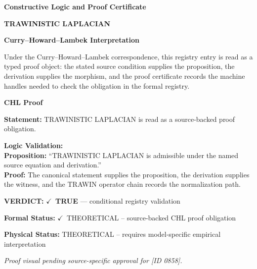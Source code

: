 \clearpage
\begingroup\tzpsupportsetup
\noindent\textbf{\fontsize{10.8pt}{12.8pt}\selectfont [ID 0858] Constructive Logic and Proof Certificate}\par
\noindent\textbf{\fontsize{10pt}{12pt}\selectfont TRAWINISTIC LAPLACIAN}\par
\vspace{0.45em}
\begingroup
\footnotesize
\setlength{\parskip}{0.22em}
\setlength{\parindent}{0pt}
\noindent\textbf{Curry--Howard--Lambek Interpretation}\par
Under the Curry--Howard--Lambek correspondence, this registry entry is read as a typed proof
object: the stated source condition supplies the proposition, the derivation supplies the
morphism, and the proof certificate records the machine handles needed to check the obligation
in the formal registry.

\vspace{0.45em}
\noindent\textbf{CHL Proof}\par
\textbf{Statement:} TRAWINISTIC LAPLACIAN is read as a source-backed proof obligation.

\textbf{Logic Validation:}\\
\textbf{Proposition:} ``TRAWINISTIC LAPLACIAN is admissible under the named source equation and derivation.''\\
\textbf{Proof:} The canonical statement supplies the proposition, the derivation supplies the witness, and the TRAWIN operator chain records the normalization path.

\textbf{VERDICT:} \ensuremath{\checkmark}\ \textbf{TRUE} --- conditional registry validation

\textbf{Formal Status:} \ensuremath{\checkmark}\ THEORETICAL -- source-backed CHL proof obligation

\textbf{Physical Status:} THEORETICAL -- requires model-specific empirical interpretation
\par\vspace{0.45em}
\par
\vfill
\begingroup\footnotesize\itshape
Proof visual pending source-specific approval for [ID 0858].
\par\endgroup
\vfill
\endgroup
\endgroup
